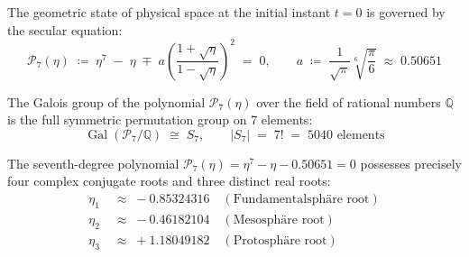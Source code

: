 \documentclass[
    12pt,
    a4paper,
    headings=normal,
    twoside=false,
    open=any,
    parskip=half
]{scrbook}
\begin{document}
\begin{physdefinition}\label{def:ch7_septic_variety_def}
The geometric state of physical space at the initial instant $t = 0$ is governed by the secular equation:
\begin{equation}
\boxed{\mathcal{P}_7(\eta) \;\coloneqq\; \eta^7 \;-\; \eta \;\mp\; a \left( \frac{1 + \sqrt{\eta}}{1 - \sqrt{\eta}} \right)^2 \;=\; 0, \qquad a \;\coloneqq\; \frac{1}{\sqrt{\pi}}\sqrt[6]{\frac{\pi}{6}} \;\approx\; 0.50651}
\label{eq:ch7_septic_variety_def}
\end{equation}
\end{physdefinition}

The Galois group of the polynomial $\mathcal{P}_7(\eta)$ over the field of rational numbers $\mathbb{Q}$ is the full symmetric permutation group on 7 elements:
\begin{equation}
\operatorname{Gal}\left( \mathcal{P}_7 / \mathbb{Q} \right) \;\cong\; S_7, \qquad |S_7| \;=\; 7! \;=\; 5040 \text{ elements}
\label{eq:ch7_galois_group_s7}
\end{equation}

\begin{phystheorem}\label{thm:ch7_three_real_roots_theorem}
The seventh-degree polynomial $\mathcal{P}_7(\eta) = \eta^7 - \eta - 0.50651 = 0$ possesses precisely four complex conjugate roots and three distinct real roots:
\begin{align}
\eta_1 &\;\approx\; -0.85324316 \quad (\text{Fundamentalsph\"are root}) \label{eq:ch7_root_1} \\
\eta_2 &\;\approx\; -0.46182104 \quad (\text{Mesosph\"are root}) \label{eq:ch7_root_2} \\
\eta_3 &\;\approx\; +1.18049182 \quad (\text{Protosph\"are root}) \label{eq:ch7_root_3}
\end{align}
\end{phystheorem}
\end{document}
